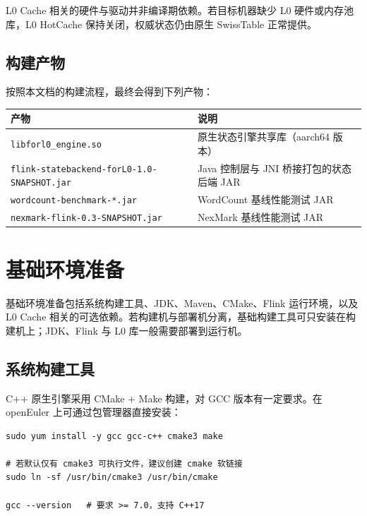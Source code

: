 \documentclass[a4paper,11pt]{article}
\begin{document}
L0 Cache 相关的硬件与驱动并非编译期依赖。若目标机器缺少 L0 硬件或内存池库，L0 HotCache 保持关闭，权威状态仍由原生 SwissTable 正常提供。

\subsection{构建产物}

按照本文档的构建流程，最终会得到下列产物：

\begin{table}[H]
\centering
\small
\begin{tabularx}{\textwidth}{L{5.8cm} X}
\toprule
\textbf{产物} & \textbf{说明} \\
\midrule
\texttt{libforl0\_engine.so} & 原生状态引擎共享库（aarch64 版本） \\
\nolinkurl{flink-statebackend-forL0-1.0-SNAPSHOT.jar} & Java 控制层与 JNI 桥接打包的状态后端 JAR \\
\nolinkurl{wordcount-benchmark-*.jar} & WordCount 基线性能测试 JAR \\
\nolinkurl{nexmark-flink-0.3-SNAPSHOT.jar} & NexMark 基线性能测试 JAR \\
\bottomrule
\end{tabularx}
\end{table}

\section{基础环境准备}

基础环境准备包括系统构建工具、JDK、Maven、CMake、Flink 运行环境，以及 L0 Cache 相关的可选依赖。若构建机与部署机分离，基础构建工具可只安装在构建机上；JDK、Flink 与 L0 库一般需要部署到运行机。

\subsection{系统构建工具}

C++ 原生引擎采用 CMake + Make 构建，对 GCC 版本有一定要求。在 openEuler 上可通过包管理器直接安装：

\begin{lstlisting}[language=shellcmd]
sudo yum install -y gcc gcc-c++ cmake3 make

# 若默认仅有 cmake3 可执行文件，建议创建 cmake 软链接
sudo ln -sf /usr/bin/cmake3 /usr/bin/cmake

gcc --version   # 要求 >= 7.0，支持 C++17
\end{lstlisting}
\end{document}
